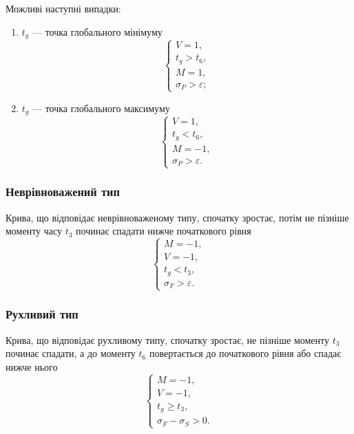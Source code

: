 Можливі наступні випадки:
\begin{enumerate}
  \item
    $t_g$ --- точка глобального мінімуму
    \begin{equation*}
      \begin{cases}
        V = 1, \\
        t_g > t_6, \\
        M = 1, \\
        \sigma_P > \varepsilon;
      \end{cases}
    \end{equation*}
  \item
    $t_g$ --- точка глобального максимуму
    \begin{equation*}
      \begin{cases}
        V = 1, \\
        t_g < t_6, \\
        M = -1, \\
        \sigma_P > \varepsilon.
      \end{cases}
    \end{equation*}
\end{enumerate}

\subsubsection{Неврівноважений тип}
Крива, що відповідає неврівноваженому типу, спочатку зростає,
потім не пізніше моменту часу $t_3$ починає спадати нижче початкового рівня
\begin{equation*}
  \begin{cases}
    M = -1, \\
    V = -1, \\
    t_g < t_3, \\
    \sigma_F > \varepsilon.
  \end{cases}
\end{equation*}

\subsubsection{Рухливий тип}
Крива, що відповідає рухливому типу, спочатку зростає,
не пізніше моменту $t_3$ починає спадати,
а до моменту $t_6$ повертається до початкового рівня або спадає нижче нього
\begin{equation*}
  \begin{cases}
    M = -1, \\
    V = -1, \\
    t_g \ge t_3, \\
    \sigma_F - \sigma_S > 0.
  \end{cases}
\end{equation*}

